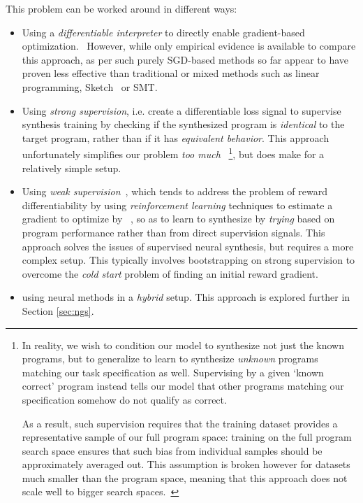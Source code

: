 \documentclass{article}
\begin{document}
This problem can be worked around in different ways:
\begin{itemize}
    \item Using a \emph{differentiable interpreter} to directly enable gradient-based optimization.~\citep{forth,terpret,houdini,feser2016differentiable,rocktaschel2017end,abadi2019simple}
        However, while only empirical evidence is available to compare this approach, as per \citet{terpret} such purely SGD-based methods so far appear to have proven less effective than traditional or mixed methods such as linear programming, Sketch~\citep{solar2008program} or SMT.
    \item Using \emph{strong supervision}, i.e. create a differentiable loss signal
        to supervise synthesis training by checking if the synthesized program is \emph{identical} to the target program,
        rather than if it has \emph{equivalent behavior}.
        This approach unfortunately simplifies our problem \emph{too much}%
        ~\footnote{
            In reality, we wish to condition our model to synthesize not just the known programs,
            but to generalize to learn to synthesize \emph{unknown} programs matching our task specification as well.
            Supervising by a given `known correct' program instead tells our model that other programs matching our specification somehow do not qualify as correct.

            As a result, such supervision requires that the training dataset provides a representative sample of our full program space:
            training on the full program search space ensures that such bias from individual samples should be approximately averaged out.
            This assumption is broken however for datasets much smaller than the program space,
            meaning that this approach does not scale well to bigger search spaces.~\citep{nsps}
        }, but does make for a relatively simple setup.
    \item Using \emph{weak supervision}~\citep{mapo},
        which tends to address the problem of reward differentiability by using \emph{reinforcement learning} techniques to estimate a gradient to optimize by%
        ~\citep{chen2017towards,bunel2018leveraging,xu2019neural,camacho2019towards},
        so as to learn to synthesize by \emph{trying} based on program performance rather than from direct supervision signals.
        This approach solves the issues of supervised neural synthesis,
        but requires a more complex setup.
        This typically involves bootstrapping on strong supervision to overcome the \emph{cold start} problem of finding an initial reward gradient.
    \item using neural methods in a \emph{hybrid} setup. This approach is explored further in Section \ref{sec:ngs}.
\end{itemize}
\end{document}
